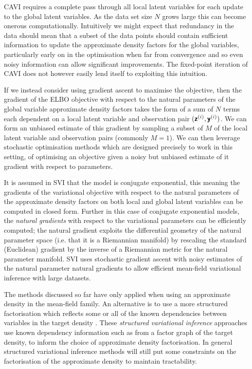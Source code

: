 \ac{CAVI} requires a complete pass through all local latent variables for each update to the global latent variables. As the data set size $N$ grows large this can become onerous computationally. Intuitively we might expect that redundancy in the data should mean that a subset of the data points should contain sufficient information to update the approximate density factors for the global variables, particularly early on in the optimisation when far from convergence and so even noisy information can allow significant improvements. The fixed-point iteration of \ac{CAVI} does not however easily lend itself to exploiting this intuition.

If we instead consider using gradient ascent to maximise the objective, then the gradient of the \ac{ELBO} objective with respect to the natural parameters of the global variable approximate density factors takes the form of a sum of $N$ terms each dependent on a local latent variable and observation pair $(\boldsymbol{\mathsf{z}}^{(i)}, \boldsymbol{\mathsf{y}}^{(i)})$. We can form an unbiased estimate of this gradient by sampling a subset of $M$ of the local latent variable and observation pairs (commonly $M=1$). We can then leverage stochastic optimisation methods \citep{robbins1951stochastic} which are designed precisely to work in this setting, of optimising an objective given a noisy but unbiased estimate of it gradient with respect to parameters. 

It is assumed in \ac{SVI} that the model is conjugate exponential, this meaning the gradients of the variational objective with respect to the natural parameters of the approximate density factors on both local and global latent variables can be computed in closed form. Further in this case of conjugate exponential models, the \emph{natural gradients} \citep{amari1982differential} with respect to the variational parameters can be efficiently computed; the natural gradient exploits the differential geometry of the natural parameter space (i.e. that it is a Riemannian manifold) by rescaling the standard (Euclidean) gradient by the inverse of a Riemannian metric for the natural parameter manifold. \ac{SVI} uses stochastic gradient ascent with noisy estimates of the natural parameter natural gradients to allow efficient mean-field variational inference with large datasets.  

The methods discussed so far have only applied when using an approximate density in the mean-field family. An alternative is to use a more structured factorisation which reflects some or all of the known dependencies between variables in the target density \citep{saul1996exploiting,barber1999tractable,storkey2000dynamic,hoffman2015structured,sheth2016monte}. These \emph{structured variational inference} approaches use known dependency information such as from a factor graph of the target density, to inform the choice of approximate density factorisation. In general structured variational inference methods will still put some constraints on the factorisation of the approximate density to maintain tractability. 

